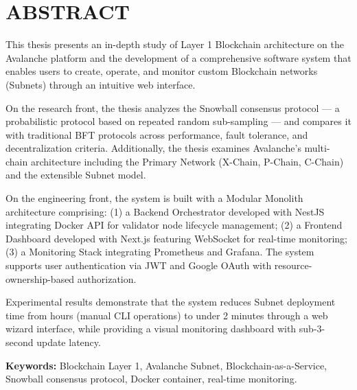 \chapter*{ABSTRACT}

This thesis presents an in-depth study of Layer 1 Blockchain architecture on the Avalanche platform and the development of a comprehensive software system that enables users to create, operate, and monitor custom Blockchain networks (Subnets) through an intuitive web interface.

On the research front, the thesis analyzes the Snowball consensus protocol --- a probabilistic protocol based on repeated random sub-sampling --- and compares it with traditional BFT protocols across performance, fault tolerance, and decentralization criteria. Additionally, the thesis examines Avalanche's multi-chain architecture including the Primary Network (X-Chain, P-Chain, C-Chain) and the extensible Subnet model.

On the engineering front, the system is built with a Modular Monolith architecture comprising: (1) a Backend Orchestrator developed with NestJS integrating Docker API for validator node lifecycle management; (2) a Frontend Dashboard developed with Next.js featuring WebSocket for real-time monitoring; (3) a Monitoring Stack integrating Prometheus and Grafana. The system supports user authentication via JWT and Google OAuth with resource-ownership-based authorization.

Experimental results demonstrate that the system reduces Subnet deployment time from hours (manual CLI operations) to under 2 minutes through a web wizard interface, while providing a visual monitoring dashboard with sub-3-second update latency.

\vspace{0.5cm}
\noindent\textbf{Keywords:} Blockchain Layer 1, Avalanche Subnet, Blockchain-as-a-Service, Snowball consensus protocol, Docker container, real-time monitoring.
